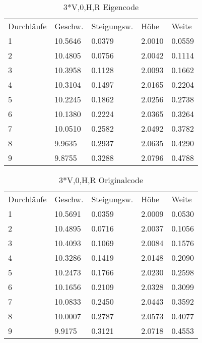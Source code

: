 \documentclass{article}
\begin{document}
\begin{table}
\centering
\caption{3*V,0,H,R Eigencode}
\begin{tabular}{lllll}
Durchläufe & Geschw. & Steigungsw. & Höhe   & Weite   \\
1          & 10.5646 & 0.0379      & 2.0010 & 0.0559  \\
2          & 10.4805 & 0.0756      & 2.0042 & 0.1114  \\
3          & 10.3958 & 0.1128      & 2.0093 & 0.1662  \\
4          & 10.3104 & 0.1497      & 2.0165 & 0.2204  \\
5          & 10.2245 & 0.1862      & 2.0256 & 0.2738  \\
6          & 10.1380 & 0.2224      & 2.0365 & 0.3264  \\
7          & 10.0510 & 0.2582      & 2.0492 & 0.3782  \\
8          & 9.9635  & 0.2937      & 2.0635 & 0.4290  \\
9          & 9.8755  & 0.3288      & 2.0796 & 0.4788 
\end{tabular}
\end{table}
\begin{table}
\centering
\caption{3*V,0,H,R Originalcode}
\begin{tabular}{lllll}
Durchläufe & Geschw.  & Steigungsw. & Höhe   & Weite      \\
1          & 10.5691 & 0.0359     & 2.0009 &  0.0530  \\
2          & 10.4895 & 0.0716     & 2.0037 &  0.1056  \\
3          & 10.4093 & 0.1069     & 2.0084 &  0.1576  \\
4          & 10.3286 & 0.1419     & 2.0148 &  0.2090  \\
5          & 10.2473 & 0.1766     & 2.0230 &  0.2598  \\
6          & 10.1656 & 0.2109     & 2.0328 &  0.3099  \\
7          & 10.0833 & 0.2450     & 2.0443 &  0.3592  \\
8          & 10.0007 & 0.2787     & 2.0573 &  0.4077  \\
9          & 9.9175 & 0.3121     & 2.0718 &  0.4553 
\end{tabular}
\end{table}
\end{document}
